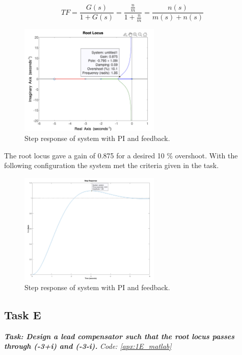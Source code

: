 \begin{equation}
    TF = \frac{G(s)}{1+G(s)} = \frac{\frac{n}{m}}{1+\frac{n}{m}} = \frac{n(s)}{m(s)+n(s)}
\end{equation}

\begin{figure}[h!]
    \centering
    \includegraphics[width = 0.6\textwidth]{Images/1D_Rlocus.png}
    \caption{Step response of system with PI and feedback.}
    \label{fig:1D_Rlocus}
\end{figure}

The root locus gave a gain of 0.875 for a desired 10 \% overshoot. With the following configuration the system met the criteria given in the task.

\begin{figure}[h!]
    \centering
    \includegraphics[width = 0.6\textwidth]{Images/1D_Step.png}
    \caption{Step response of system with PI and feedback.}
    \label{fig:1D_Step}
\end{figure}

\newpage
\subsection{Task E}
\textbf{\textit{Task: Design a lead compensator such that the root locus passes through (-3+i) and (-3-i).}}
\newline
\textit{Code: \ref{apx:1E_matlab}}

